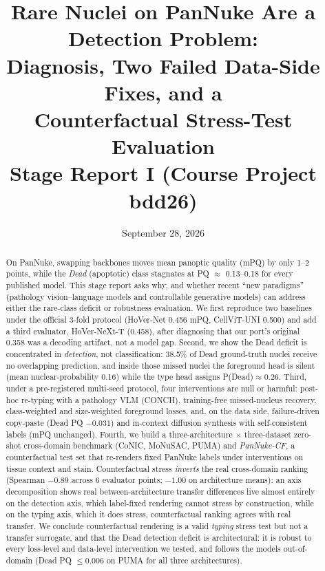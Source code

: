 \documentclass[11pt]{article}
\title{\bfseries Rare Nuclei on PanNuke Are a Detection Problem:\\
Diagnosis, Two Failed Data-Side Fixes, and a\\ Counterfactual Stress-Test Evaluation\\[6pt]
\large Stage Report I (Course Project bdd26)}
\author{}
\date{September 28, 2026}
\begin{document}
\maketitle

\begin{abstract}
On PanNuke, swapping backbones moves mean panoptic quality (mPQ) by only 1--2 points, while the
\emph{Dead} (apoptotic) class stagnates at PQ $\approx$ 0.13--0.18 for every published model. This
stage report asks why, and whether recent ``new paradigms'' (pathology vision--language models
and controllable generative models) can address either the rare-class deficit or robustness
evaluation. We first reproduce two baselines under the official 3-fold protocol (HoVer-Net
0.456 mPQ, CellViT-UNI 0.500) and add a third evaluator, HoVer-NeXt-T (0.458), after diagnosing
that our port's original 0.358 was a decoding artifact, not a model gap. Second, we show the Dead
deficit is concentrated in \emph{detection}, not classification: 38.5\% of Dead ground-truth
nuclei receive no overlapping prediction, and inside those missed nuclei the foreground head is
silent (mean nuclear-probability 0.16) while the type head assigns P(Dead)$\approx$0.26. Third,
under a pre-registered multi-seed protocol, four interventions are null or harmful: post-hoc
re-typing with a pathology VLM (CONCH), training-free missed-nucleus recovery, class-weighted and
size-weighted foreground losses, and, on the data side, failure-driven copy-paste (Dead PQ
$-0.031$) and in-context diffusion synthesis with self-consistent labels (mPQ unchanged).
Fourth, we build a three-architecture $\times$ three-dataset zero-shot cross-domain benchmark
(CoNIC, MoNuSAC, PUMA) and \emph{PanNuke-CF}, a counterfactual test set that re-renders fixed
PanNuke labels under interventions on tissue context and stain. Counterfactual stress
\emph{inverts} the real cross-domain ranking (Spearman $-0.89$ across 6 evaluator points;
$-1.00$ on architecture means): an axis decomposition shows real between-architecture transfer
differences live almost entirely on the detection axis, which label-fixed rendering cannot
stress by construction, while on the typing axis, which it does stress, counterfactual ranking
agrees with real transfer. We conclude counterfactual rendering is a valid \emph{typing} stress
test but not a transfer surrogate, and that the Dead detection deficit is architectural: it is
robust to every loss-level and data-level intervention we tested, and follows the models
out-of-domain (Dead PQ $\leq 0.006$ on PUMA for all three architectures).
\end{abstract}
\end{document}

